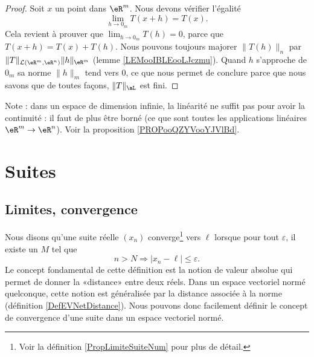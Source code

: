 \begin{proof}
      Soit $x$ un point dans $\eR^m$. Nous devons vérifier l'égalité
      \begin{equation}
       \lim_{h\to 0_m}T(x+h)=T(x).
      \end{equation}
      Cela revient à prouver que $\lim_{h\to 0_m}T(h)=0$, parce que $T(x+h)=T(x)+T(h)$. Nous pouvons toujours majorer $\|T(h)\|_n$ par $\|T\|_{\mathcal{L}(\eR^m,\eR^n)}\| h \|_{\eR^m}$ (lemme \ref{LEMooIBLEooLJczmu}). Quand $h$ s'approche de $ 0_m $ sa norme $\|h\|_m$ tend vers $0$, ce que nous permet de conclure parce que nous savons que de toutes façons, $\| T \|_{\aL}$ est fini.
\end{proof}

Note : dans un espace de dimension infinie, la linéarité ne suffit pas pour avoir la continuité : il faut de plus être borné (ce que sont toutes les applications linéaires \( \eR^m\to\eR^n\)). Voir la proposition \ref{PROPooQZYVooYJVlBd}.

\section{Suites}
\label{SECooLLUGooOwZRyI}

\subsection{Limites, convergence}

Nous disons qu'une suite réelle $(x_n)$ converge\footnote{Voir la définition \ref{PropLimiteSuiteNum} pour plus de détail.} vers $\ell$ lorsque pour tout $\varepsilon$, il existe un $M$ tel que
\begin{equation}
	n>N\Rightarrow | x_n-\ell |\leq\varepsilon.
\end{equation}
Le concept fondamental de cette définition est la notion de valeur absolue qui permet de donner la «distance» entre deux réels. Dans un espace vectoriel normé quelconque, cette notion est généralisée par la distance associée à la norme (définition \ref{DefEVNetDistance}). Nous pouvons donc facilement définir le concept de convergence d'une suite dans un espace vectoriel normé.

